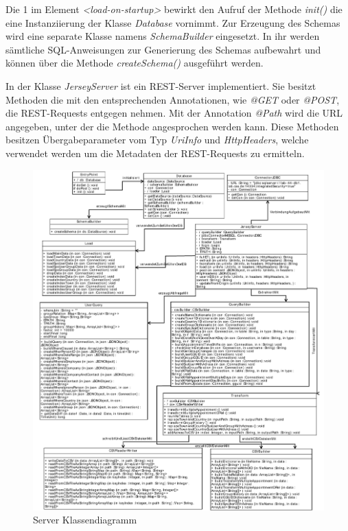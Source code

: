 Die 1 im Element \textit{<load-on-startup>} bewirkt den Aufruf der Methode \textit{init()} die eine Instanziierung der Klasse \textit{Database} vornimmt. Zur Erzeugung des Schemas wird eine separate Klasse namens \textit{SchemaBuilder} eingesetzt. In ihr werden sämtliche SQL-Anweisungen zur Generierung des Schemas aufbewahrt und können über die Methode \textit{createSchema()} ausgeführt werden.

In der Klasse \textit{JerseyServer} ist ein REST-Server implementiert. Sie besitzt Methoden die mit den entsprechenden Annotationen, wie \textit{@GET} oder \textit{@POST}, die REST-Requests entgegen nehmen. Mit der Annotation \textit{@Path} wird die URL angegeben, unter der die Methode angesprochen werden kann. Diese Methoden besitzen Übergabeparameter vom Typ \textit{UriInfo} und \textit{HttpHeaders}, welche verwendet werden um die Metadaten der REST-Requests zu ermitteln. 


\begin{figure}[htbp]
\begin{center}
\includegraphics[width=1.0\textwidth]{pics/ServerKlassendiagramm.pdf}
\caption{Server Klassendiagramm}
\label{umsetzung_klassendiagramm_server}
\end{center}
\end{figure}


